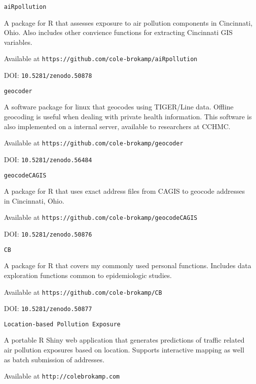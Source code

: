 \documentclass[margin,line]{res}
\newenvironment{list1}{
  \begin{list}{\ding{113}}{%
      \setlength{\itemsep}{0in}
      \setlength{\parsep}{0in} \setlength{\parskip}{0in}
      \setlength{\topsep}{0in} \setlength{\partopsep}{0in} 
      \setlength{\leftmargin}{0.17in}}}{\end{list}}
\begin{document}
\begin{resume}
\texttt{aiRpollution}
\begin{list1} \itemsep 2pt
\item[] A package for R that assesses exposure to air pollution components in Cincinnati, Ohio.  Also includes other convience functions for extracting Cincinnati GIS variables.
\item[] Available at \texttt{https://github.com/cole-brokamp/aiRpollution}
\item[] DOI: \texttt{10.5281/zenodo.50878}
\end{list1}

\texttt{geocoder}
\begin{list1} \itemsep 2pt
\item[] A software package for linux that geocodes using TIGER/Line data.  Offline geocoding is useful when dealing with private health information. This software is also implemented on a internal server, available to researchers at CCHMC.
\item[] Available at \texttt{https://github.com/cole-brokamp/geocoder}
\item[] DOI: \texttt{10.5281/zenodo.56484}
\end{list1}

\texttt{geocodeCAGIS}
\begin{list1} \itemsep 2pt
\item[] A package for R that uses exact address files from CAGIS to geocode addresses in Cincinnati, Ohio.
\item[] Available at \texttt{https://github.com/cole-brokamp/geocodeCAGIS}
\item[] DOI: \texttt{10.5281/zenodo.50876}
\end{list1}

\texttt{CB}
\begin{list1} \itemsep 2pt
\item[] A package for R that covers my commonly used personal functions. Includes data exploration functions common to epidemiologic studies. 
\item[] Available at \texttt{https://github.com/cole-brokamp/CB}
\item[] DOI: \texttt{10.5281/zenodo.50877}
\end{list1}

\texttt{Location-based Pollution Exposure}
\begin{list1} \itemsep 2pt
\item[] A portable R Shiny web application that generates predictions of traffic related air pollution exposures based on location.  Supports interactive mapping as well as batch submission of addresses.
\item[] Available at \texttt{http://colebrokamp.com}
\end{list1}


\end{resume}
\end{document}
